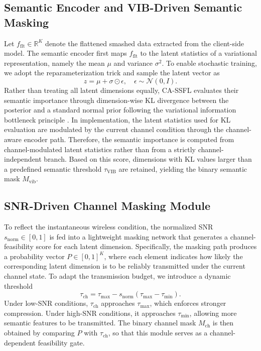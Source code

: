 \subsection{Semantic Encoder and VIB-Driven Semantic Masking}
Let $f_{\mathrm{flt}} \in \mathbb{R}^{K}$ denote the flattened smashed data extracted from the client-side model. The semantic encoder first maps $f_{\mathrm{flt}}$ to the latent statistics of a variational representation, namely the mean $\mu$ and variance $\sigma^2$. To enable stochastic training, we adopt the reparameterization trick \cite{kingma2013auto} and sample the latent vector as
\begin{equation}
z = \mu + \sigma \odot \epsilon, \quad \epsilon \sim \mathcal{N}(0, I).
\end{equation}
Rather than treating all latent dimensions equally, CA-SSFL evaluates their semantic importance through dimension-wise KL divergence between the posterior and a standard normal prior following the variational information bottleneck principle \cite{alemi2017deep}. In implementation, the latent statistics used for KL evaluation are modulated by the current channel condition through the channel-aware encoder path. Therefore, the semantic importance is computed from channel-modulated latent statistics rather than from a strictly channel-independent branch. Based on this score, dimensions with KL values larger than a predefined semantic threshold $\tau_{\mathrm{VIB}}$ are retained, yielding the binary semantic mask $M_{\mathrm{vib}}$.

\subsection{SNR-Driven Channel Masking Module}
To reflect the instantaneous wireless condition, the normalized SNR $s_{\mathrm{norm}} \in [0,1]$ is fed into a lightweight masking network that generates a channel-feasibility score for each latent dimension. Specifically, the masking path produces a probability vector $P \in [0,1]^K$, where each element indicates how likely the corresponding latent dimension is to be reliably transmitted under the current channel state. To adapt the transmission budget, we introduce a dynamic threshold
\begin{equation}
\tau_{\mathrm{ch}} = \tau_{\max} - s_{\mathrm{norm}}(\tau_{\max}-\tau_{\min}).
\end{equation}
Under low-SNR conditions, $\tau_{\mathrm{ch}}$ approaches $\tau_{\max}$, which enforces stronger compression. Under high-SNR conditions, it approaches $\tau_{\min}$, allowing more semantic features to be transmitted. The binary channel mask $M_{\mathrm{ch}}$ is then obtained by comparing $P$ with $\tau_{\mathrm{ch}}$, so that this module serves as a channel-dependent feasibility gate.

